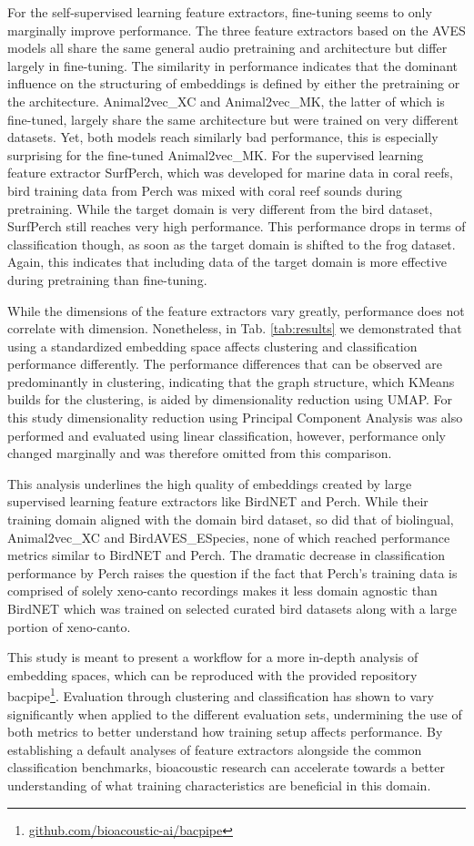 For the self-supervised learning feature extractors, fine-tuning seems to only marginally improve performance.
The three feature extractors based on the AVES models all share the same general audio pretraining and architecture but differ largely in fine-tuning. 
The similarity in performance indicates that the dominant influence on the structuring of embeddings is defined by either the pretraining or the architecture.
Animal2vec\_XC and Animal2vec\_MK, the latter of which is fine-tuned, largely share the same architecture but were trained on very different datasets.
Yet, both models reach similarly bad performance, this is especially surprising for the fine-tuned Animal2vec\_MK.
For the supervised learning feature extractor SurfPerch, which was developed for marine data in coral reefs, bird training data from Perch was mixed with coral reef sounds during pretraining.
While the target domain is very different from the bird dataset, SurfPerch still reaches very high performance.
This performance drops in terms of classification though, as soon as the target domain is shifted to the frog dataset.
Again, this indicates that including data of the target domain is more effective during pretraining than fine-tuning.

While the dimensions of the feature extractors vary greatly, performance does not correlate with dimension.
Nonetheless, in Tab. \ref{tab:results} we demonstrated that using a standardized embedding space affects clustering and classification performance differently.
The performance differences that can be observed are predominantly in clustering, indicating that the graph structure, which KMeans builds for the clustering, is aided by dimensionality reduction using UMAP.
For this study dimensionality reduction using Principal Component Analysis was also performed and evaluated using linear classification, however, performance only changed marginally and was therefore omitted from this comparison.

This analysis underlines the high quality of embeddings created by large supervised learning feature extractors like BirdNET and Perch.
While their training domain aligned with the domain bird dataset, so did that of biolingual, Animal2vec\_XC and BirdAVES\_ESpecies, none of which reached performance metrics similar to BirdNET and Perch.
The dramatic decrease in classification performance by Perch raises the question if the fact that Perch's training data is comprised of solely xeno-canto recordings makes it less domain agnostic than BirdNET which was trained on selected curated bird datasets along with a large portion of xeno-canto.

This study is meant to present a workflow for a more in-depth analysis of embedding spaces, which can be reproduced with the provided repository bacpipe\footnote{\url{github.com/bioacoustic-ai/bacpipe}}.
Evaluation through clustering and classification has shown to vary significantly when applied to the different evaluation sets, undermining the use of both metrics to better understand how training setup affects performance.
By establishing a default analyses of feature extractors alongside the common classification benchmarks, bioacoustic research can accelerate towards a better understanding of what training characteristics are beneficial in this domain.